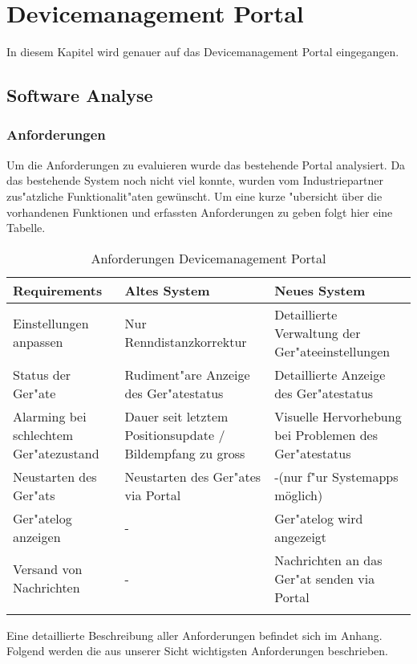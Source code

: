 \chapter{Devicemanagement Portal}

In diesem Kapitel wird genauer auf das Devicemanagement Portal eingegangen.

\section{Software Analyse}

\subsection{Anforderungen}
Um die Anforderungen zu evaluieren wurde das bestehende Portal analysiert. Da das bestehende System noch nicht viel konnte, wurden vom Industriepartner zus"{a}tzliche Funktionalit"{a}ten gew\"{u}nscht.
Um eine kurze "{u}bersicht \"{u}ber die vorhandenen Funktionen und erfassten Anforderungen zu geben folgt hier eine Tabelle.

{\renewcommand{\arraystretch}{2}%
    \begin{longtable}{ | p{3cm} | p{4cm} | p{4cm} |}
    \hline
    \textbf{Requirements} & \textbf{Altes System} & \textbf{Neues System} \\ \hline
\hline
    Einstellungen anpassen & Nur Renndistanzkorrektur & Detaillierte Verwaltung der Ger"{a}teeinstellungen \\ \hline
    Status der Ger"{a}te & Rudiment"{a}re Anzeige des Ger"{a}testatus & Detaillierte Anzeige des Ger"{a}testatus \\
    \hline
     Alarming bei schlechtem Ger"{a}tezustand & Dauer seit letztem Positionsupdate / Bildempfang zu gross & Visuelle Hervorhebung bei Problemen des Ger"{a}testatus \\
    \hline
    Neustarten des Ger"{a}ts & Neustarten des Ger"{a}tes via Portal & -(nur f"{u}r Systemapps möglich)\\
    \hline
    Ger"{a}telog anzeigen & - & Ger"{a}telog wird angezeigt\\
    \hline
    Versand von Nachrichten & - & Nachrichten an das Ger"{a}t senden via Portal\\
    \hline
   
\caption{Anforderungen Devicemanagement Portal}
\end{longtable}}

Eine detaillierte Beschreibung aller Anforderungen befindet sich im Anhang. Folgend werden die aus unserer Sicht wichtigsten Anforderungen beschrieben.


